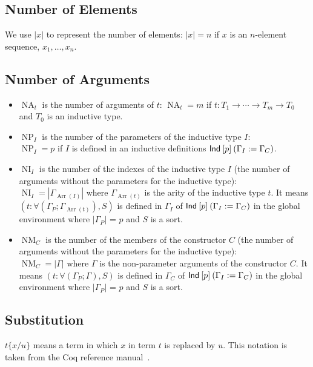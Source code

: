\documentclass[a4paper,fleqn]{article}
\DeclareMathOperator{\NA}{NA} %
\DeclareMathOperator{\NP}{NP} %
\DeclareMathOperator{\NI}{NI} %
\DeclareMathOperator{\NM}{NM} %
\DeclareMathOperator{\Arr}{Arr} %
\newcommand{\arr}[1]{\Gamma_{\Arr(#1)}}
\newcommand{\subst}[3]{#1\{#2/#3\}}
\begin{document}
\subsection{Number of Elements}

We use $|x|$ to represent the number of elements: $|x|=n$ if $x$ is an $n$-element sequence, $x_1, \ldots, x_n$.

\subsection{Number of Arguments}

\begin{itemize}
  \item $\NA_t$ is the number of arguments of $t$: \quad $\NA_t=m$ if $t : T_1 \rightarrow \dotsb \rightarrow T_m \rightarrow T_0$ and $T_0$ is an inductive type.
  \item $\NP_I$ is the number of the parameters of the inductive type $I$: \\
    $\NP_I=p$ if $I$ is defined in an inductive definitions $\text{\sf Ind}\:[p]\:(\Gamma_I := \Gamma_C)$.
  \item $\NI_I$ is the number of the indexes of the inductive type $I$ (the number of arguments without the parameters for the inductive type): \\
    $\NI_I=|\arr{I}|$ where
    $\arr{t}$ is the arity of the inductive type $t$.
    It means $(t : \forall (\Gamma_P; \arr{t}), S)$ is defined in $\Gamma_I$ of $\text{\sf Ind}\:[p]\:(\Gamma_I := \Gamma_C)$ in the global environment where
    $|\Gamma_P|$ = $p$ and $S$ is a sort.
  \item $\NM_C$ is the number of the members of the constructor $C$ (the number of arguments without the parameters for the inductive type): \\
    $\NM_C=|\Gamma|$ where
    $\Gamma$ is the non-parameter arguments of the constructor $C$.
    It means $(t : \forall (\Gamma_P; \Gamma), S)$ is defined in $\Gamma_C$ of $\text{\sf Ind}\:[p]\:(\Gamma_I := \Gamma_C)$ in the global environment where
    $|\Gamma_P|$ = $p$ and $S$ is a sort.
\end{itemize}

\subsection{Substitution}
$\subst{t}{x}{u}$ means a term in which $x$ in term $t$ is replaced by $u$.
This notation is taken from the Coq reference manual~\cite{coqrefman8.12.0}.
\end{document}
